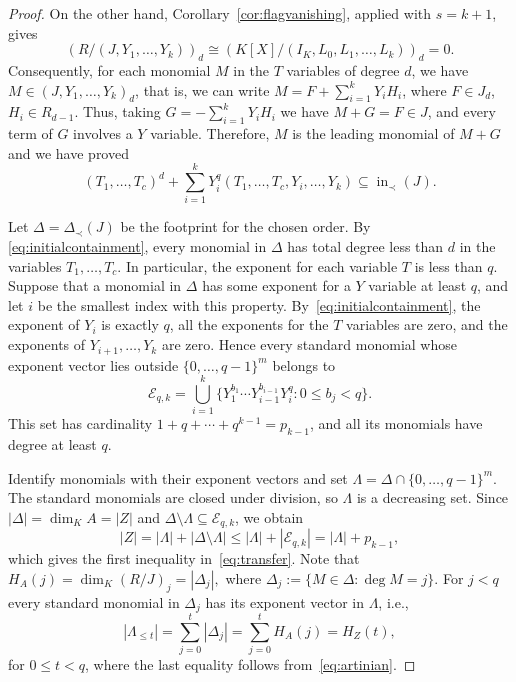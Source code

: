 \documentclass[11pt]{amsart}
\theoremstyle{definition}
\newcommand{\ini}{\operatorname{in}}
\newcommand{\card}[1]{\left|#1\right|}
\numberwithin{equation}{section}
\begin{document}
\begin{proof}
On the other hand, Corollary~\ref{cor:flagvanishing}, applied with
$s=k+1$, gives
\[
 (R/(J,Y_1,\ldots,Y_k))_d 
\cong
(K[X]/(I_K,L_0,L_1,\ldots,L_k))_d
=0.
\]
Consequently, for each monomial $M$ in the $T$ variables of degree $d$, we have $M\in (J,Y_1,\ldots,Y_k)_d$, that is, we can write $M=F+\sum_{i=1}^kY_i H_i$, where $F\in J_d$, $H_i\in R_{d-1}$. Thus, taking $G=-\sum_{i=1}^k Y_i H_i$ we have $M+G=F\in J$, and every term of $G$ involves a $Y$ variable. Therefore, $M$ is the leading monomial of $M+G$ and we have proved
\begin{equation}\label{eq:initialcontainment}
 (T_1,\ldots,T_c)^d+
 \sum_{i=1}^kY_i^q(T_1,\ldots,T_c,Y_i,\ldots,Y_k)
 \subseteq\ini_\prec(J).
\end{equation}

Let $\Delta=\Delta_\prec(J)$ be the footprint for the chosen order.
By \eqref{eq:initialcontainment}, every monomial in $\Delta$ has total degree less than $d$
in the variables $T_1,\ldots,T_c$.
In particular, the exponent for each variable $T$ is less than $q$. Suppose that a
monomial in $\Delta$ has some exponent for a $Y$ variable at least $q$, and let $i$
be the smallest index with this property. By~\eqref{eq:initialcontainment},
the exponent of $Y_i$ is exactly $q$, all the exponents for the $T$ variables are zero,
and the exponents of $Y_{i+1},\ldots,Y_k$ are zero. Hence every
standard monomial whose exponent vector lies outside
$\{0,\ldots,q-1\}^m$ belongs to
\[
 \mathcal E_{q,k}
 =\bigcup_{i=1}^k
 \{Y_1^{b_1}\cdots Y_{i-1}^{b_{i-1}}Y_i^q:
                     0\le b_j<q\}.
\]
This set has cardinality $1+q+\cdots+q^{k-1}=p_{k-1}$,
and all its monomials have degree at least $q$.

Identify monomials with their exponent vectors and set
$\Lambda=\Delta\cap\{0,\ldots,q-1\}^m$.
The standard monomials are closed under division, so $\Lambda$ is
a decreasing set.
Since $\card\Delta=\dim_K A=\card Z$ and
$\Delta\setminus\Lambda\subseteq\mathcal E_{q,k}$, we obtain
\[
\card Z
=\card\Lambda+\card{\Delta\setminus\Lambda}
\le\card\Lambda+\card{\mathcal E_{q,k}}
=\card\Lambda+p_{k-1},
\]
which gives the first inequality in~\eqref{eq:transfer}. Note that \(
H_A(j)=\dim_K(R/J)_j=|\Delta_j|,
\)
where $\Delta_j:=\{M\in\Delta:\deg M=j\}$. For $j<q$ every standard monomial in $\Delta_j$ has its exponent vector in $\Lambda$, i.e., 
\[
|\Lambda_{\le t}|
=\sum_{j=0}^{t}|\Delta_j|
=\sum_{j=0}^{t}H_A(j)
=H_Z(t),
\]
for $0\le t<q$, where the last equality follows from~\eqref{eq:artinian}.
\end{proof}
\end{document}
